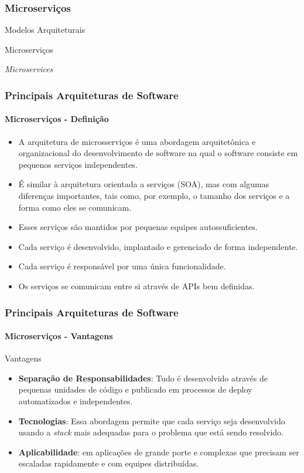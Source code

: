 \documentclass[
	10pt, %
	t, %
]{beamer}
\begin{document}
\subsubsection{Microserviços}

\begin{frame}
	\begin{center}
		
		\bigskip\bigskip\bigskip\bigskip %
		{\Large Modelos Arquiteturais}
		
		\bigskip\bigskip %
		{\Huge Microserviços}
		
		\smallskip
		{\small \textit{Microservices}}
	\end{center}

\end{frame}

\begin{frame}
	\frametitle{Principais Arquiteturas de Software}
	\framesubtitle{Microserviços - Definição}

	\begin{itemize}
		\item A arquitetura de microsserviços é uma abordagem arquitetônica e organizacional do desenvolvimento de software na qual o software consiste em \alert{pequenos serviços independentes}.
		\item É similar à \alert{arquitetura orientada a serviços (SOA)}, mas com algumas diferenças importantes, tais como, por exemplo, o tamanho dos serviços e a forma como eles se comunicam.
		\item Esses serviços são mantidos por \alert{pequenas equipes autossuficientes}.
		\item Cada serviço é desenvolvido, implantado e gerenciado de forma \alert{independente}.
		\item Cada serviço é responsável por uma \alert{única funcionalidade}.
		\item Os serviços se comunicam entre si através de \alert{APIs} bem definidas.
	\end{itemize}

\end{frame}

\begin{frame}
	\frametitle{Principais Arquiteturas de Software}
	\framesubtitle{Microserviços - Vantagens}

	\begin{exampleblock}{Vantagens}
		\begin{itemize}
			\item \textbf{Separação de Responsabilidades}: Tudo é desenvolvido através de pequenas unidades de código e publicado em processos de deploy automatizados e independentes.
			\item \textbf{Tecnologias}: Essa abordagem permite que cada serviço seja desenvolvido usando a \textit{stack} mais adequadas para o problema que está sendo resolvido.
			\item \textbf{Aplicabilidade}: em aplicações de \alert{grande porte e complexas} que precisam ser escaladas rapidamente e com equipes distribuídas.
		\end{itemize}
	\end{exampleblock}
\end{frame}
\end{document}

